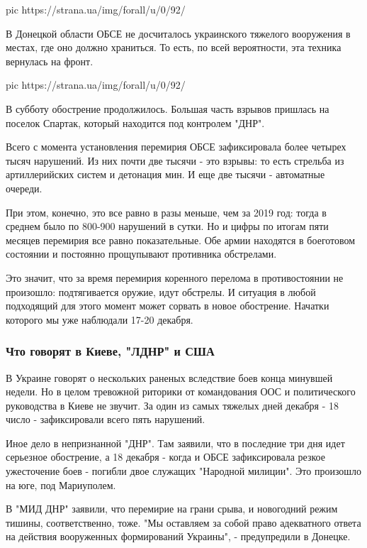 \ifcmt
pic https://strana.ua/img/forall/u/0/92/%
\fi

В Донецкой области ОБСЕ не досчиталось украинского тяжелого вооружения в
местах, где оно должно храниться. То есть, по всей вероятности, эта техника
вернулась на фронт. 

\ifcmt
pic https://strana.ua/img/forall/u/0/92/%
\fi

В субботу обострение продолжилось. Большая часть взрывов пришлась на поселок
Спартак, который находится под контролем "ДНР". 

Всего с момента установления перемирия ОБСЕ зафиксировала более четырех тысяч
нарушений. Из них почти две тысячи - это взрывы: то есть стрельба из
артиллерийских систем и детонация мин. И еще две тысячи - автоматные очереди. 

При этом, конечно, это все равно в разы меньше, чем за 2019 год: тогда в
среднем было по 800-900 нарушений в сутки. Но и цифры по итогам пяти месяцев
перемирия все равно показательные. Обе армии находятся в боеготовом состоянии и
постоянно прощупывают противника обстрелами. 

Это значит, что за время перемирия коренного перелома в противостоянии не
произошло: подтягивается оружие, идут обстрелы. И ситуация в любой подходящий
для этого момент может сорвать в новое обострение. Начатки которого мы уже
наблюдали 17-20 декабря.

\subsubsection{Что говорят в Киеве, "ЛДНР" и США}

В Украине говорят о нескольких раненых вследствие боев конца минувшей недели.
Но в целом тревожной риторики от командования ООС и политического руководства в
Киеве не звучит. За один из самых тяжелых дней декабря - 18 число -
зафиксировали всего пять нарушений. 

Иное дело в непризнанной "ДНР". Там заявили, что в последние три дня идет
серьезное обострение, а 18 декабря - когда и ОБСЕ зафиксировала резкое
ужесточение боев - погибли двое служащих "Народной милиции". Это произошло на
юге, под Мариуполем.

В "МИД ДНР" заявили, что перемирие на грани срыва, и новогодний режим тишины,
соответственно, тоже. "Мы оставляем за собой право адекватного ответа на
действия вооруженных формирований Украины", - предупредили в Донецке.

